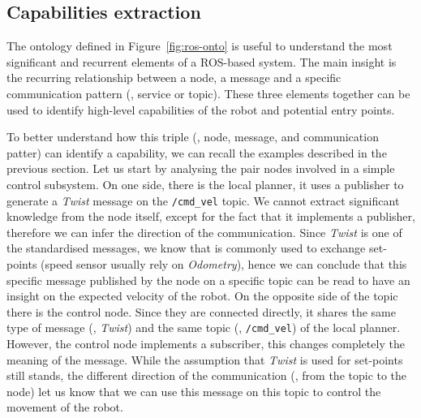 \subsection{Capabilities extraction}
\label{sec:cap-ext}
The ontology defined in Figure~\ref{fig:ros-onto} is useful to understand the most significant and recurrent elements of a ROS-based system. The main insight is the recurring relationship between a node, a message and a specific communication pattern (\ie, service or topic). These three elements together can be used to identify high-level capabilities of the robot and potential entry points.

To better understand how this triple (\ie, node, message, and communication patter) can identify a capability, we can recall the examples described in the previous section. Let us start by analysing the pair nodes involved in a simple control subsystem. On one side, there is the local planner, it uses a publisher to generate a \textit{Twist} message on the \texttt{/cmd\_vel} topic. We cannot extract significant knowledge from the node itself, except for the fact that it implements a publisher, therefore we can infer the direction of the communication. Since \textit{Twist} is one of the standardised messages, we know that is commonly used to exchange set-points (speed sensor usually rely on \textit{Odometry}), hence we can conclude that this specific message published by the node on a specific topic can be read to have an insight on the expected velocity of the robot. On the opposite side of the topic there is the control node. Since they are connected directly, it shares the same type of message (\ie, \textit{Twist}) and the same topic (\ie, \texttt{/cmd\_vel}) of the local planner. However, the control node implements a subscriber, this changes completely the meaning of the message. While the assumption that \textit{Twist} is used for set-points still stands, the different direction of the communication (\ie, from the topic to the node) let us know that we can use this message on this topic to control the movement of the robot.

